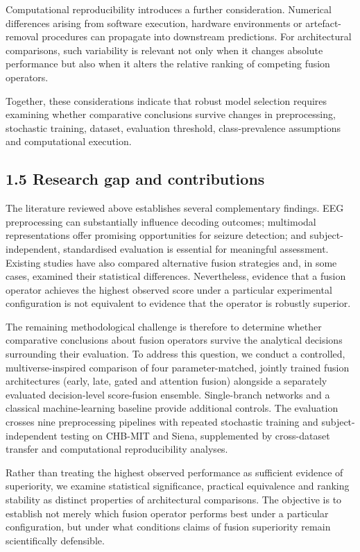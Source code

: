 \documentclass[11pt,a4paper]{article}
\begin{document}
Computational reproducibility introduces a further consideration. Numerical differences
arising from software execution, hardware environments or artefact-removal procedures can
propagate into downstream predictions. For architectural comparisons, such variability is
relevant not only when it changes absolute performance but also when it alters the
relative ranking of competing fusion operators.

Together, these considerations indicate that robust model selection requires examining
whether comparative conclusions survive changes in preprocessing, stochastic training,
dataset, evaluation threshold, class-prevalence assumptions and computational execution.

\subsection{1.5 Research gap and contributions}\label{research-gap-and-contributions}

The literature reviewed above establishes several complementary findings. EEG
preprocessing can substantially influence decoding outcomes; multimodal representations
offer promising opportunities for seizure detection; and subject-independent, standardised
evaluation is essential for meaningful assessment. Existing studies have also compared
alternative fusion strategies and, in some cases, examined their statistical differences.
Nevertheless, evidence that a fusion operator achieves the highest observed score under a
particular experimental configuration is not equivalent to evidence that the operator is
robustly superior.

The remaining methodological challenge is therefore to determine whether comparative
conclusions about fusion operators survive the analytical decisions surrounding their
evaluation. To address this question, we conduct a controlled, multiverse-inspired
comparison of four parameter-matched, jointly trained fusion architectures (early, late,
gated and attention fusion) alongside a separately evaluated decision-level score-fusion
ensemble. Single-branch networks and a classical machine-learning baseline provide
additional controls. The evaluation crosses nine preprocessing pipelines with repeated
stochastic training and subject-independent testing on CHB-MIT and Siena, supplemented by
cross-dataset transfer and computational reproducibility analyses.

Rather than treating the highest observed performance as sufficient evidence of
superiority, we examine statistical significance, practical equivalence and ranking
stability as distinct properties of architectural comparisons. The objective is to
establish not merely which fusion operator performs best under a particular configuration,
but under what conditions claims of fusion superiority remain scientifically defensible.
\end{document}
